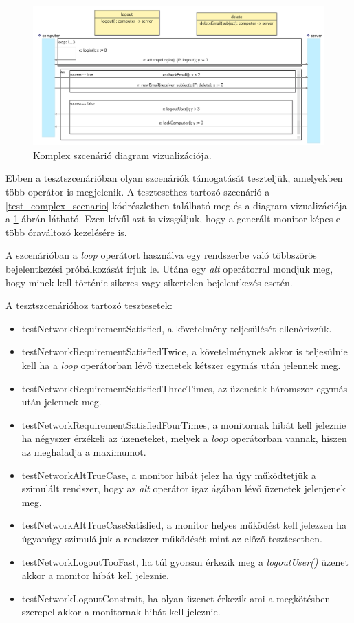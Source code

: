 \begin{figure}[!ht]
    \centering
    \includegraphics[width=160mm, keepaspectratio]{figures/diagramOperatorExample.png}
    \caption{Komplex szcenárió diagram vizualizációja.}
    \label{test_complex_diagram}
\end{figure}

Ebben a tesztszcenárióban olyan szcenáriók támogatását teszteljük, amelyekben több operátor is megjelenik.
A tesztesethez tartozó szcenárió a \ref{test_complex_scenario} kódrészletben található meg és a diagram vizualizációja a \ref{test_complex_diagram} ábrán látható.
Ezen kívűl azt is vizsgáljuk, hogy a generált monitor képes e több óraváltozó kezelésére is.

A szcenárióban a \textit{loop} operátort használva egy rendszerbe való többszörös bejelentkezési próbálkozását írjuk le.
Utána egy \textit{alt} operátorral mondjuk meg, hogy minek kell történie sikeres vagy sikertelen bejelentkezés esetén.

A tesztszcenárióhoz tartozó tesztesetek:
\begin{itemize}
    \item testNetworkRequirementSatisfied, a követelmény teljesülését ellenőrizzük.
    \item testNetworkRequirementSatisfiedTwice, a követelménynek akkor is teljesülnie kell ha a \textit{loop} operátorban lévő üzenetek kétszer egymás után jelennek meg.
    \item testNetworkRequirementSatisfiedThreeTimes, az üzenetek háromszor egymás után jelennek meg.
    \item testNetworkRequirementSatisfiedFourTimes, a monitornak hibát kell jeleznie ha négyszer érzékeli az üzeneteket, melyek a \textit{loop} operátorban vannak, hiszen az meghaladja a maximumot.
    \item testNetworkAltTrueCase, a monitor hibát jelez ha úgy működtetjük a szimulált rendszer, hogy az \textit{alt} operátor igaz ágában lévő üzenetek jelenjenek meg.
    \item testNetworkAltTrueCaseSatisfied, a monitor helyes működést kell jelezzen ha úgyanúgy szimuláljuk a rendszer működését mint az előző tesztesetben.
    \item testNetworkLogoutTooFast, ha túl gyorsan érkezik meg a \textit{logoutUser()} üzenet akkor a monitor hibát kell jeleznie.
    \item testNetworkLogoutConstrait, ha olyan üzenet érkezik ami a megkötésben szerepel akkor a monitornak hibát kell jeleznie.
\end{itemize}

